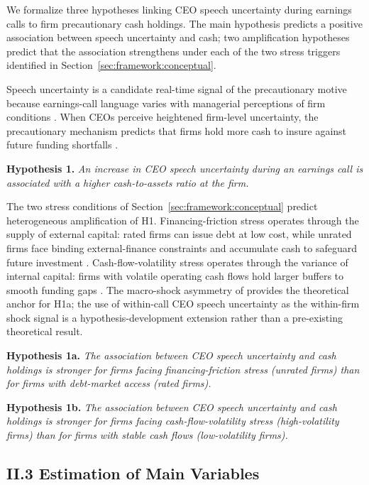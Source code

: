 We formalize three hypotheses linking CEO speech uncertainty during earnings calls to firm precautionary cash holdings. The main hypothesis predicts a positive association between speech uncertainty and cash; two amplification hypotheses predict that the association strengthens under each of the two stress triggers identified in Section~\ref{sec:framework:conceptual}.

Speech uncertainty is a candidate real-time signal of the precautionary motive because earnings-call language varies with managerial perceptions of firm conditions \cite{dzielinski2021}. When CEOs perceive heightened firm-level uncertainty, the precautionary mechanism predicts that firms hold more cash to insure against future funding shortfalls \cite{opler1999,bates2009}.

\noindent\textbf{Hypothesis 1.} \textit{An increase in CEO speech uncertainty during an earnings call is associated with a higher cash-to-assets ratio at the firm.}

\smallskip

The two stress conditions of Section~\ref{sec:framework:conceptual} predict heterogeneous amplification of H1. Financing-friction stress operates through the supply of external capital: rated firms can issue debt at low cost, while unrated firms face binding external-finance constraints and accumulate cash to safeguard future investment \cite{faulkender2006,almeida2004}. Cash-flow-volatility stress operates through the variance of internal capital: firms with volatile operating cash flows hold larger buffers to smooth funding gaps \cite{hanqiu2007}. The macro-shock asymmetry of  provides the theoretical anchor for H1a; the use of within-call CEO speech uncertainty as the within-firm shock signal is a hypothesis-development extension rather than a pre-existing theoretical result.

\noindent\textbf{Hypothesis 1a.} \textit{The association between CEO speech uncertainty and cash holdings is stronger for firms facing financing-friction stress (unrated firms) than for firms with debt-market access (rated firms).}

\smallskip

\noindent\textbf{Hypothesis 1b.} \textit{The association between CEO speech uncertainty and cash holdings is stronger for firms facing cash-flow-volatility stress (high-volatility firms) than for firms with stable cash flows (low-volatility firms).}

\subsection*{II.3 Estimation of Main Variables}
\label{sec:framework:estimation}

